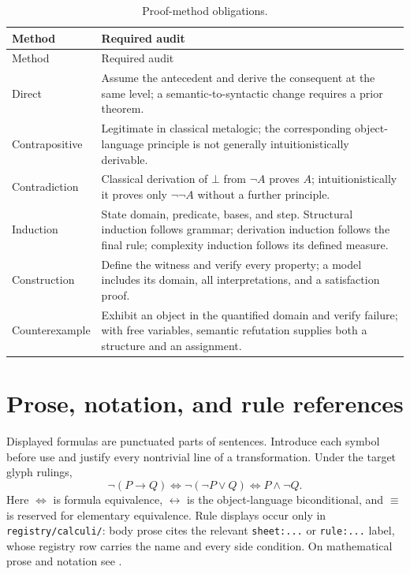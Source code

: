 \begingroup\small
\begin{longtable}{@{}p{}p{}@{}}
\caption{Proof-method obligations.}
\label{tab:p01-proof-methods}\\
\toprule
Method & Required audit \\
\midrule
\endfirsthead
\toprule
Method & Required audit \\
\midrule
\endhead
Direct\index{proof!direct} & Assume the antecedent and derive the consequent
at the same level; a semantic-to-syntactic change requires a prior theorem. \\
Contrapositive\index{proof!contrapositive} & Legitimate in classical
metalogic; the corresponding object-language principle is not generally
intuitionistically derivable. \\
Contradiction\index{proof!by contradiction} & Classical derivation of
\(\bot\) from \(\neg A\) proves \(A\); intuitionistically it proves only
\(\neg\neg A\) without a further principle. \\
Induction\index{proof!by induction} & State domain, predicate, bases, and
step.  Structural induction follows grammar; derivation induction follows the
final rule; complexity induction follows its defined measure. \\
Construction\index{proof!by construction} & Define the witness and verify
every property; a model includes its domain, all interpretations, and a
satisfaction proof. \\
Counterexample\index{counterexample} & Exhibit an object in the quantified
domain and verify failure; with free variables, semantic refutation supplies
both a structure and an assignment. \\
\bottomrule
\end{longtable}
\endgroup

\section{Prose, notation, and rule references}
\label{sec:p01-formula-prose}

Displayed formulas are punctuated parts of sentences.  Introduce each symbol
before use and justify every nontrivial line of a transformation.  Under the
target glyph rulings,
\[
 \neg(P\to Q)\Leftrightarrow\neg(\neg P\lor Q)
 \Leftrightarrow P\land\neg Q.
\]
Here \(\Leftrightarrow\) is formula equivalence,
\(\leftrightarrow\) is the object-language biconditional, and \(\equiv\)
is reserved for elementary equivalence.  Rule displays occur only in
\texttt{registry/calculi/}: body prose cites the relevant
\texttt{sheet:...} or \texttt{rule:...} label, whose registry row carries
the name and every side condition.  On mathematical prose and notation see
\cite{Halmos1970,KnuthLarrabeeRoberts1989,AMSAuthorHandbook}.

